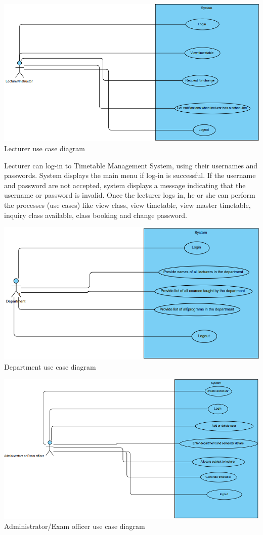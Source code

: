 \documentclass{scrreprt}
\begin{document}
\begin{center}
\includegraphics[scale=0.6]{lecturer.png}
Lecturer use case diagram

\end{center}
 Lecturer can log-in to Timetable Management System, using their usernames and
passwords. System displays the main menu if log-in is successful. If the username and
password are not accepted, system displays a message indicating that the username or
password is invalid. Once the lecturer logs in, he or she can perform the processes (use
cases) like view class, view timetable, view master timetable, inquiry class available,
class booking and change password. 
\begin{center}
\includegraphics[scale=0.6]{department.png}
Department use case diagram
\end{center}
\begin{center}
\includegraphics[scale=0.6]{admin.png}
Administrator/Exam officer use case diagram
\end{center}
\end{document}
